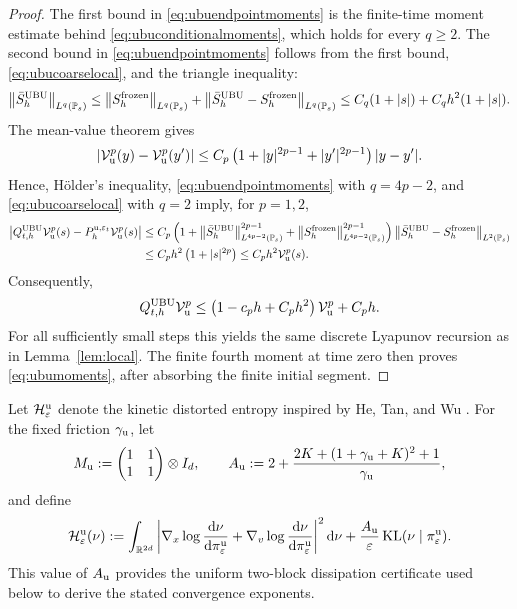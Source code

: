 \documentclass[11pt]{article}
\theoremstyle{definition}
\newcommand{\R}{\mathbb R}
\newcommand{\dd}{\mathrm d}
\newcommand{\KL}{\operatorname{KL}}
\newcommand{\Id}{I}
\newcommand{\cH}{\mathcal H}
\newcommand{\eps}{\varepsilon}
\begin{document}
\begin{proof}
The first bound in \eqref{eq:ubuendpointmoments} is the finite-time moment estimate behind
\eqref{eq:ubuconditionalmoments}, which holds for every $q\geq2$. The second bound in \eqref{eq:ubuendpointmoments}
follows from the first bound, \eqref{eq:ubucoarselocal}, and the triangle
inequality:
\[
 \left\|\bar S_h^{\rm UBU}\right\|_{L^q(\mathbb P_s)}
 \leq\left\|S_h^{\rm frozen}\right\|_{L^q(\mathbb P_s)}
 +\left\|\bar S_h^{\rm UBU}-S_h^{\rm frozen}\right\|_{L^q(\mathbb P_s)}
 \leq C_q(1+|s|)+C_qh^2(1+|s|).
\]
The mean-value theorem gives
\[
 \left|\mathcal V_{\rm u}^p(y)-\mathcal V_{\rm u}^p(y')\right|
 \leq C_p\left(1+|y|^{2p-1}+|y'|^{2p-1}\right)|y-y'|.
\]
Hence, H\"older's inequality, \eqref{eq:ubuendpointmoments} with $q=4p-2$,
and \eqref{eq:ubucoarselocal} with $q=2$ imply, for $p=1,2$,
\[
\begin{aligned}
 \left|Q^{\rm UBU}_{t,h}\mathcal V_{\rm u}^p(s)
       -P^{{\rm u},\eps_t}_h\mathcal V_{\rm u}^p(s)\right|
 &\leq C_p\left(1+\left\|\bar S_h^{\rm UBU}\right\|_{L^{4p-2}(\mathbb P_s)}^{2p-1}
      +\left\|S_h^{\rm frozen}\right\|_{L^{4p-2}(\mathbb P_s)}^{2p-1}\right)
      \left\|\bar S_h^{\rm UBU}-S_h^{\rm frozen}\right\|_{L^2(\mathbb P_s)}\\
 &\leq C_ph^2\left(1+|s|^{2p}\right)
 \leq C_ph^2\mathcal V_{\rm u}^p(s).
\end{aligned}
\]
Consequently,
\[
 Q^{\rm UBU}_{t,h}\mathcal V_{\rm u}^p
 \leq \left(1-c_ph+C_ph^2\right)\mathcal V_{\rm u}^p+C_ph.
\]
For all sufficiently small steps this yields the same discrete Lyapunov
recursion as in Lemma~\ref{lem:local}. The finite fourth moment at time zero
then proves \eqref{eq:ubumoments}, after absorbing the finite initial segment.
\end{proof}

Let $\cH^{\rm u}_\eps$ denote the kinetic distorted entropy inspired by
He, Tan, and Wu \cite[Eq.~(2.7)]{HeTanWu2024}. For the fixed friction
$\gamma_{\rm u}$, let
\[
 M_{\rm u}:=
 \begin{pmatrix}1&1\\1&1\end{pmatrix}\otimes\Id_d,\qquad
 A_{\rm u}:=
 2+\frac{2K+(1+\gamma_{\rm u}+K)^2+1}{\gamma_{\rm u}},
\]
and define
\begin{equation}\label{eq:ulddistorted}
 \cH^{\rm u}_\eps(\nu)
 :=\int_{\R^{2d}}
 \left|\nabla_x\log\frac{\dd\nu}{\dd\pi^{\rm u}_\eps}
       +\nabla_v\log\frac{\dd\nu}{\dd\pi^{\rm u}_\eps}\right|^2\dd\nu
   +\frac{A_{\rm u}}{\eps}\KL(\nu\mid\pi^{\rm u}_\eps).
\end{equation}
This value of $A_{\rm u}$ provides the uniform two-block dissipation
certificate used below to derive the stated convergence exponents.
\end{document}

